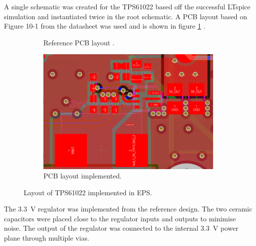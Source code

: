 \documentclass{report}
\begin{document}
A single schematic was created for the TPS61022 based off the successful LTspice simulation and instantiated twice in the root schematic. A PCB layout based on Figure 10-1 from the datasheet was used and is shown in figure \ref{fig:TPS61022-layout} \cite{ti2021tps61022}.

\begin{figure}[H]
  \begin{subfigure}{0.495\textwidth}
    \centering
    
    \caption{Reference PCB layout \cite{ti2021tps61022}.}
  \end{subfigure}
  \begin{subfigure}{0.495\textwidth}
    \centering
    \includegraphics[width=\linewidth]{images/TPS61022-pcb-layout.svg.png}
    \caption{PCB layout implemented.}
  \end{subfigure}
  \caption{Layout of TPS61022 implemented in EPS.}
  \label{fig:TPS61022-layout}
\end{figure}

The \SI{3.3}{\volt} regulator was implemented from the reference design. The two ceramic capacitors were placed close to the regulator inputs and outputs to minimise noise. The output of the regulator was connected to the internal \SI{3.3}{\volt} power plane through multiple vias.
\end{document}

